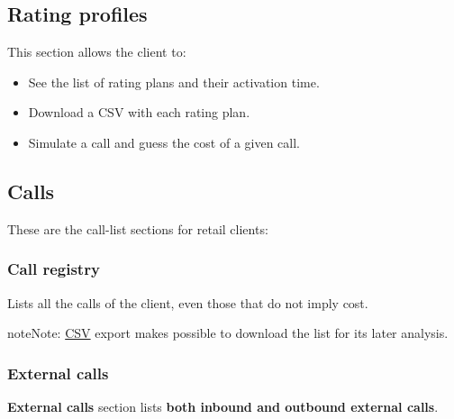 \documentclass[letterpaper,10pt,english]{sphinxmanual}
\begin{document}
\subsection{Rating profiles}
\label{administration_portal/client/retail/rating_profiles:rating-profiles}\label{administration_portal/client/retail/rating_profiles::doc}
This section allows the client to:
\begin{itemize}
\item {} 
See the list of rating plans and their activation time.

\item {} 
Download a CSV with each rating plan.

\item {} 
Simulate a call and guess the cost of a given call.

\end{itemize}


\subsection{Calls}
\label{administration_portal/client/retail/calls/index::doc}\label{administration_portal/client/retail/calls/index:calls}
These are the call-list sections for retail clients:


\subsubsection{Call registry}
\label{administration_portal/client/retail/calls/call_registry::doc}\label{administration_portal/client/retail/calls/call_registry:call-registry}\label{administration_portal/client/retail/calls/call_registry:id1}
Lists all the calls of the client, even those that do not imply cost.

\begin{notice}{note}{Note:}
\href{https://es.wikipedia.org/wiki/CSV}{CSV} export makes possible to
download the list for its later analysis.
\end{notice}


\subsubsection{External calls}
\label{administration_portal/client/retail/calls/external_calls:id1}\label{administration_portal/client/retail/calls/external_calls::doc}\label{administration_portal/client/retail/calls/external_calls:external-calls}
\textbf{External calls} section lists \textbf{both inbound and outbound external calls}.
\end{document}
